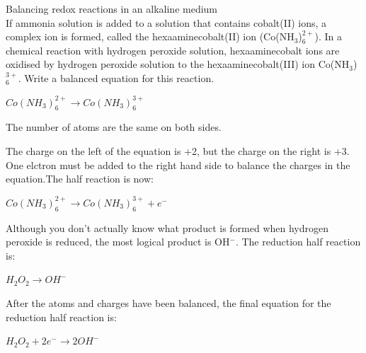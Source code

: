 \begin{wex}{Balancing redox reactions in an alkaline medium\\}{If ammonia solution is added to a solution that contains cobalt(II) ions, a complex ion is formed, called the hexaaminecobalt(II) ion (Co(NH$_{3}$)$_{6}^{2+}$). In a chemical reaction with hydrogen peroxide solution, hexaaminecobalt ions are oxidised by hydrogen peroxide solution to the hexaaminecobalt(III) ion Co(NH$_{3}$)$_{6}^{3+}$. Write a balanced equation for this reaction.\\}

{

\begin{center}
\rm${Co(NH_{3})_{6}^{2+} \rightarrow Co(NH_{3})_{6}^{3+}}$\\
\end{center}

The number of atoms are the same on both sides.\\

The charge on the left of the equation is +2, but the charge on the right is +3. One elctron must be added to the right hand side to balance the charges in the equation.The half reaction is now:

\begin{center}
\rm${Co(NH_{3})_{6}^{2+} \rightarrow Co(NH_{3})_{6}^{3+} + e^{-}}$\\
\end{center}

Although you don't actually know what product is formed when hydrogen peroxide is reduced, the most logical product is OH$^{-}$. The reduction half reaction is:

\begin{center}
\rm${H_{2}O_{2} \rightarrow OH^{-}}$\\
\end{center}

After the atoms and charges have been balanced, the final equation for the reduction half reaction is:

\begin{center}
\rm${H_{2}O_{2} + 2e^{-} \rightarrow 2OH^{-}}$\\
\end{center}

}
\end{wex}
